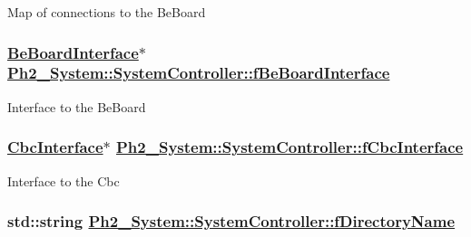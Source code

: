 Map of connections to the Be\-Board \hypertarget{class_ph2___system_1_1_system_controller_8e8bc5e14aaf6659673c16c7dea5e57d}{
\subsubsection[fBeBoardInterface]{\setlength{\rightskip}{0pt plus 5cm}\hyperlink{class_ph2___hw_interface_1_1_be_board_interface}{Be\-Board\-Interface}$\ast$ \hyperlink{class_ph2___system_1_1_system_controller_8e8bc5e14aaf6659673c16c7dea5e57d}{Ph2\_\-System::System\-Controller::f\-Be\-Board\-Interface}}}
\label{class_ph2___system_1_1_system_controller_8e8bc5e14aaf6659673c16c7dea5e57d}


Interface to the Be\-Board \hypertarget{class_ph2___system_1_1_system_controller_e38e8bcea2b76c5981d2b0e49559ad16}{
\subsubsection[fCbcInterface]{\setlength{\rightskip}{0pt plus 5cm}\hyperlink{class_ph2___hw_interface_1_1_cbc_interface}{Cbc\-Interface}$\ast$ \hyperlink{class_ph2___system_1_1_system_controller_e38e8bcea2b76c5981d2b0e49559ad16}{Ph2\_\-System::System\-Controller::f\-Cbc\-Interface}}}
\label{class_ph2___system_1_1_system_controller_e38e8bcea2b76c5981d2b0e49559ad16}


Interface to the Cbc \hypertarget{class_ph2___system_1_1_system_controller_9b8f6dbf9a063b51334c3ff91b10adac}{
\subsubsection[fDirectoryName]{\setlength{\rightskip}{0pt plus 5cm}std::string \hyperlink{class_ph2___system_1_1_system_controller_9b8f6dbf9a063b51334c3ff91b10adac}{Ph2\_\-System::System\-Controller::f\-Directory\-Name}}}
\label{class_ph2___system_1_1_system_controller_9b8f6dbf9a063b51334c3ff91b10adac}


